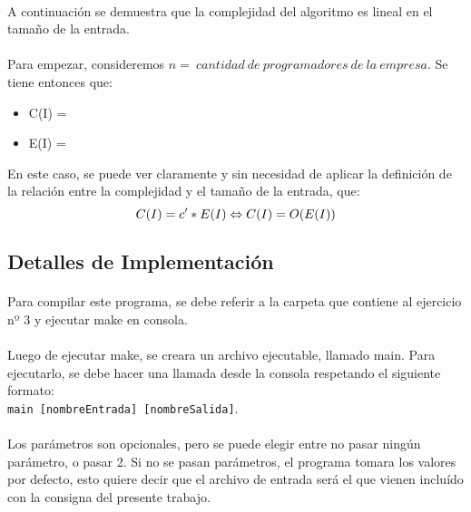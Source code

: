 \paragraph{}
A continuación se demuestra que la complejidad del algoritmo es lineal en el tamaño de la entrada.

\paragraph{}
Para empezar, consideremos $n =\ cantidad\ de\ programadores\ de\ la\ empresa$. Se tiene entonces que:
\begin{itemize}
	\item C(I) = 
	\item E(I) = 
\end{itemize}

En este caso, se puede ver claramente y sin necesidad de aplicar la definición de la relación entre la complejidad y el tamaño de la entrada, que:
\begin{equation}
	C(I) = c' * E(I) \Leftrightarrow C(I) = O(E(I))
\end{equation}


\subsection{Detalles de Implementación}

\paragraph{}
Para compilar este programa, se debe referir a la carpeta que contiene al ejercicio nº 3 y ejecutar make en consola.

\paragraph{}
Luego de ejecutar make, se creara un archivo ejecutable, llamado main. Para ejecutarlo, se debe hacer una llamada desde la consola respetando el siguiente formato:\\
\texttt{main [nombreEntrada] [nombreSalida]}.

\paragraph{}
Los parámetros son opcionales, pero se puede elegir entre no pasar ningún parámetro, o pasar 2. Si no se pasan parámetros, el programa tomara los valores por defecto, esto quiere decir que el archivo de entrada será el que vienen incluído con la consigna del presente trabajo.





